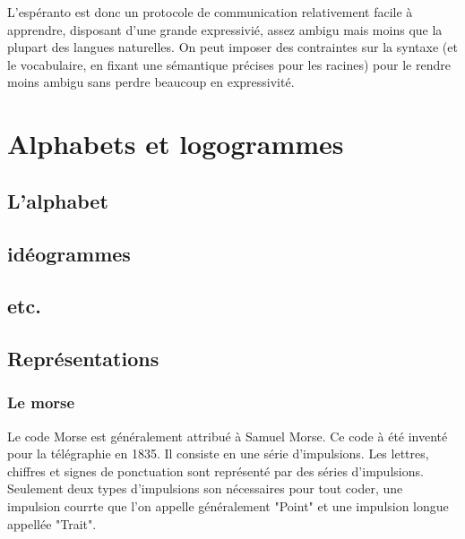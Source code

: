 \documentclass[french,a4paper]{article}
\begin{document}
L'espéranto est donc un protocole de communication relativement facile
à apprendre, disposant d'une grande expressivié, assez ambigu mais
moins que la plupart des langues naturelles. On peut imposer des
contraintes sur la syntaxe (et le vocabulaire, en fixant une
sémantique précises pour les racines) pour le rendre moins ambigu sans
perdre beaucoup en expressivité.

\section{Alphabets et logogrammes}

\subsection{L'alphabet}


\subsection{idéogrammes}
\subsection{etc.}

\subsection{Représentations}

\subsubsection{Le morse}
Le code Morse est généralement attribué à Samuel Morse. Ce code à été inventé pour la télégraphie en 1835.
Il consiste en une série d'impulsions. Les lettres, chiffres et signes de ponctuation sont représenté par des séries d'impulsions.
Seulement deux types d'impulsions son nécessaires pour tout coder, une impulsion courrte que l'on appelle généralement
"Point" et une impulsion longue appellée "Trait".
\end{document}
